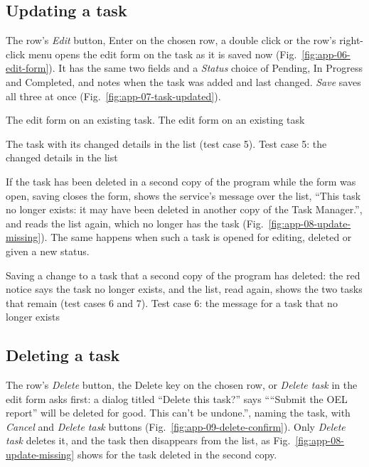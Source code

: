 \subsection{Updating a task}

The row's \emph{Edit} button, Enter on the chosen row, a double click or the row's right-click menu opens the edit
form on the task as it is saved now (Fig.~\ref{fig:app-06-edit-form}). It has the same two fields and a \emph{Status}
choice of Pending, In Progress and Completed, and notes when the task was added and last changed. \emph{Save} saves
all three at once
(Fig.~\ref{fig:app-07-task-updated}).

  {The edit form on an existing task.}
  {The edit form on an existing task}

  {The task with its changed details in the list (test case 5).}
  {Test case 5: the changed details in the list}

If the task has been deleted in a second copy of the program while the form was open, saving closes the form, shows
the service's message over the list, ``This task no longer exists: it may have been deleted in another copy of the
Task Manager.'', and reads the list again, which no longer has the task (Fig.~\ref{fig:app-08-update-missing}). The
same happens when such a task is opened for editing, deleted or given a new status.

  {Saving a change to a task that a second copy of the program has deleted: the red notice says the task no longer
   exists, and the list, read again, shows the two tasks that remain (test cases 6 and 7).}
  {Test case 6: the message for a task that no longer exists}

\subsection{Deleting a task}

The row's \emph{Delete} button, the Delete key on the chosen row, or \emph{Delete task} in the edit form asks first:
a dialog titled ``Delete this task?'' says ``“Submit the OEL report” will be deleted for good. This can't be
undone.'', naming the task, with \emph{Cancel} and \emph{Delete task} buttons (Fig.~\ref{fig:app-09-delete-confirm}). Only \emph{Delete task} deletes it, and the task then disappears from the list, as Fig.~\ref{fig:app-08-update-missing}
shows for the task deleted in the second copy.

